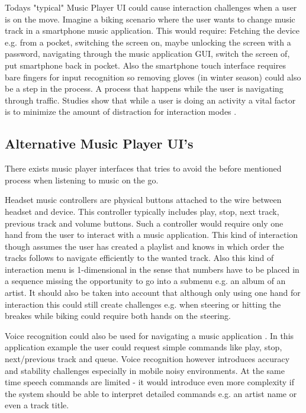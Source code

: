 Todays "typical" Music Player UI could cause interaction challenges when a user is on the move. Imagine a biking scenario where the user wants to change music track in a smartphone music application. This would require: Fetching the device e.g. from a pocket, switching the screen on, maybe unlocking the screen with a password, navigating through the music application GUI, switch the screen of, put smartphone back in pocket. Also the smartphone touch interface requires bare fingers for input recognition so removing gloves (in winter season) could also be a step in the process. A process that happens while the user is navigating through traffic. Studies show that while a user is doing an activity a vital factor is to minimize the amount of distraction for interaction modes \cite{pascoe_using_2000}.

\subsection{Alternative Music Player UI's}
There exists music player interfaces that tries to avoid the before mentioned process when listening to music on the go.

Headset music controllers are physical buttons attached to the wire between headset and device. This controller typically includes play, stop, next track, previous track and volume buttons. Such a controller would require only one hand from the user to interact with a music application. This kind of interaction though assumes the user has created a playlist and knows in which order the tracks follows to navigate efficiently to the wanted track. Also this kind of interaction menu is 1-dimensional in the sense that numbers have to be placed in a sequence missing the opportunity to go into a submenu e.g. an album of an artist. It should also be taken into account that although only using one hand for interaction this could still create challenges e.g. when steering or hitting the breakes while biking could require both hands on the steering.

Voice recognition could also be used for navigating a music application \cite{stewart_boling_voice_2013}. In this application example the user could request simple commands like play, stop, next/previous track and queue. Voice recognition however introduces accuracy and stability challenges especially in mobile noisy environments. At the same time speech commands are limited - it would introduce even more complexity if the system should be able to interpret detailed commands e.g. an artist name or even a track title.

